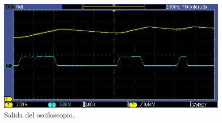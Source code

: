 \documentclass[11pt,a4paper]{article}
\begin{document}
\begin{figure}[h]
    \centering
    \includegraphics[scale = 0.85]{images/IE_practica_3_osciloscopio_sensor_temperatura.PNG}
    \caption{Salida del osciloscopio.}
    \label{c}
\end{figure}
\end{document}
